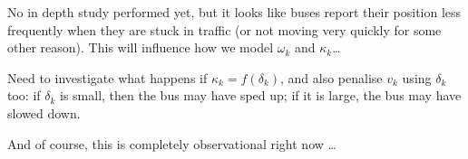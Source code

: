 \documentclass[10pt,a4paper]{article}
\begin{document}
No in depth study performed yet, but it looks like buses report their position less 
frequently when they are stuck in traffic (or not moving very quickly for some other
reason).
This will influence how we model $\omega_k$ and $\kappa_k$\ldots

Need to investigate what happens if $\kappa_k = f(\delta_k)$,
and also penalise $v_k$ using $\delta_k$ too: if $\delta_k$ is small, 
then the bus may have sped up; if it is large, the bus may have slowed down.

And of course, this is completely observational right now \ldots
\end{document}
